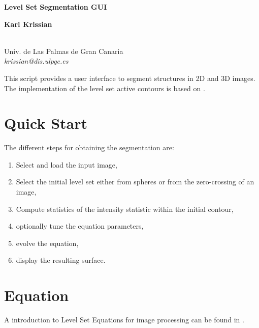 \documentclass{article}
\begin{document}
\centerline{\Large \bf Level Set Segmentation GUI}
 \smallskip

 \centerline{\bf Karl Krissian}
  \smallskip
  \centerline{
  \\
  Univ. de Las Palmas de Gran Canaria\\
  {\it krissian@dis.ulpgc.es}
  }



    This script provides a user interface to segment structures in 2D and 3D images. 
    The implementation of the level set active contours is based on \cite{KrissianWestin05}.



\section{Quick Start}

The different steps for obtaining the segmentation are:
\begin{enumerate}
  \item Select and load the input image,
  \item Select the initial level set either from spheres or from the zero-crossing of an image,
  \item Compute statistics of the intensity statistic within the initial contour,
  \item optionally tune the equation parameters,
  \item evolve the equation,
  \item display the resulting surface.
\end{enumerate}


\section{Equation}
A introduction to Level Set Equations for image processing can be found in 
\cite{Sethian99book,Sapiro01,Osher2002,OsherParagios2003}.
\end{document}
